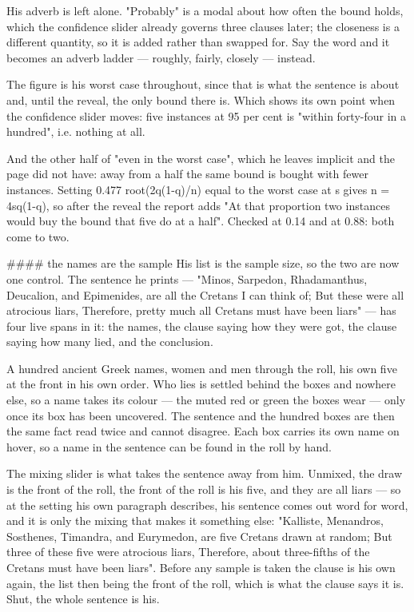 His adverb is left alone. "Probably" is a modal about how often the bound holds,
which the confidence slider already governs three clauses later; the closeness is
a different quantity, so it is added rather than swapped for. Say the word and it
becomes an adverb ladder — roughly, fairly, closely — instead.

The figure is his worst case throughout, since that is what the sentence is
about and, until the reveal, the only bound there is. Which shows its own point
when the confidence slider moves: five instances at 95 per cent is "within
forty-four in a hundred", i.e. nothing at all.

And the other half of "even in the worst case", which he leaves implicit and the
page did not have: away from a half the same bound is bought with fewer
instances. Setting 0.477 root(2q(1-q)/n) equal to the worst case at s gives
n = 4sq(1-q), so after the reveal the report adds "At that proportion two
instances would buy the bound that five do at a half". Checked at 0.14 and at
0.88: both come to two.

#### the names are the sample
His list is the sample size, so the two are now one control. The sentence he
prints — "Minos, Sarpedon, Rhadamanthus, Deucalion, and Epimenides, are all the
Cretans I can think of; But these were all atrocious liars, Therefore, pretty
much all Cretans must have been liars" — has four live spans in it: the names,
the clause saying how they were got, the clause saying how many lied, and the
conclusion.

A hundred ancient Greek names, women and men through the roll, his own five at
the front in his own order. Who lies is settled behind the boxes and nowhere
else, so a name takes its colour — the muted red or green the boxes wear — only
once its box has been uncovered. The sentence and the hundred boxes are then the
same fact read twice and cannot disagree. Each box carries its own name on
hover, so a name in the sentence can be found in the roll by hand.

The mixing slider is what takes the sentence away from him. Unmixed, the draw is
the front of the roll, the front of the roll is his five, and they are all
liars — so at the setting his own paragraph describes, his sentence comes out
word for word, and it is only the mixing that makes it something else: "Kalliste,
Menandros, Sosthenes, Timandra, and Eurymedon, are five Cretans drawn at random;
But three of these five were atrocious liars, Therefore, about three-fifths of
the Cretans must have been liars". Before any sample is taken the clause is his
own again, the list then being the front of the roll, which is what the clause
says it is. Shut, the whole sentence is his.

